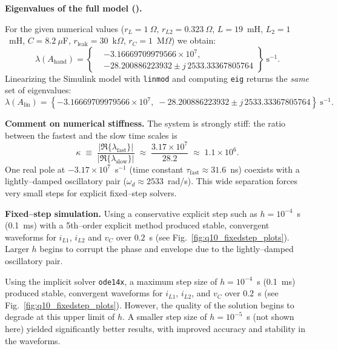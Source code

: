 \vspace{1em}

\textbf{Eigenvalues of the full model ().}

For the given numerical values
($r_L=1~\Omega$, $r_{L2}=0.323~\Omega$, $L=19$~mH, $L_2=1$~mH,
$C=8.2~\mu$F, $r_{\text{leak}}=30$~k$\Omega$, $r_C=1$~M$\Omega$)
we obtain:
\[
\boxed{
\lambda(A_{\text{hand}})=
\left\{
\begin{aligned}
&-3.16669709979566\times 10^{7} ,\\
&-28.200886223932 \pm j\,2533.33367805764
\end{aligned}
\right\}~\text{s}^{-1}.
}
\]
Linearizing the Simulink model with \verb|linmod| and computing \verb|eig|
returns the \emph{same} set of eigenvalues:
\[
\boxed{
\lambda(A_{\text{lin}})=
\left\{
-3.16669709979566\times 10^{7},\;
-28.200886223932 \pm j\,2533.33367805764
\right\}~\text{s}^{-1}.
}
\]

\vspace{0.5em}
\textbf{Comment on numerical stiffness.}
The system is strongly stiff: the ratio between the fastest and the slow
time scales is
\[
\kappa \;\equiv\; \frac{|\Re\{\lambda_{\text{fast}}\}|}{|\Re\{\lambda_{\text{slow}}\}|}
\;\approx\; \frac{3.17\times 10^{7}}{28.2} \;\approx\; 1.1\times 10^{6}.
\]
One real pole at $-3.17\times 10^{7}$~s$^{-1}$ (time constant $\tau_{\text{fast}}\approx
31.6$~ns) coexists with a lightly–damped oscillatory pair
($\omega_d\approx 2533$~rad/s). This wide separation
forces very small steps for explicit fixed–step solvers.

\vspace{0.75em}
\textbf{Fixed–step simulation.}
Using a conservative explicit step such as $h=10^{-4}$~s (0.1~ms) with a
5th–order explicit method produced stable, convergent waveforms for
$i_{L1}$, $i_{L2}$ and $v_C$ over $0.2$~s (see
Fig.~\ref{fig:q10_fixedstep_plots}). Larger $h$ begins to corrupt the phase
and envelope due to the lightly–damped oscillatory pair.

Using the implicit solver \verb|ode14x|, a maximum step size of $h=10^{-4}$~s (0.1~ms) produced stable, convergent waveforms for $i_{L1}$, $i_{L2}$, and $v_C$ over $0.2$~s (see Fig.~\ref{fig:q10_fixedstep_plots}). However, the quality of the solution begins to degrade at this upper limit of $h$. A smaller step size of $h=10^{-5}$~s (not shown here) yielded significantly better results, with improved accuracy and stability in the waveforms.

